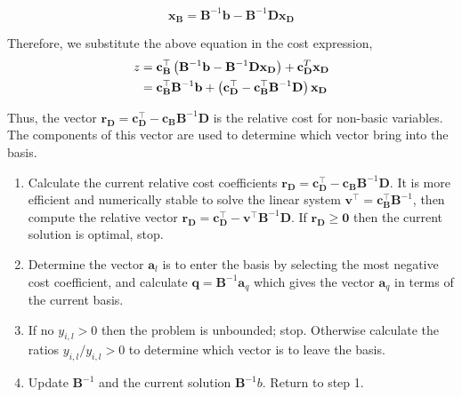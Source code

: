 \begin{equation*}
	\mathbf{x}_{\mathbf{B}}=\mathbf{B}^{-1}\mathbf{b}-\mathbf{B}^{-1}\mathbf{D}\mathbf{x}_{\mathbf{D}}
\end{equation*}

Therefore, we substitute the above equation in the cost expression,
\begin{align*}
	z&=\mathbf{c}_{\mathbf{B}}^\top\left( \mathbf{B}^{-1}\mathbf{b}-\mathbf{B}^{-1}\mathbf{Dx}_{\mathbf D} \right)+\mathbf{c}_{\mathbf{D}}^T \mathbf{x}_{\mathbf D}\\
	&=\mathbf{c}_{\mathbf{B}}^\top\mathbf{B}^{-1}\mathbf{b}+\left( \mathbf{c}_{\mathbf{D}}^\top-\mathbf{c}_{\mathbf{B}}^\top\mathbf{B}^{-1}\mathbf{D} \right)\mathbf{x}_{\mathbf{D}}
\end{align*}


Thus, the vector $\mathbf{r}_{\mathbf{D}}=\mathbf{c}_{\mathbf{D}}^\top-\mathbf{c}_{\mathbf{B}}\mathbf{B}^{-1}\mathbf{D}$ is the relative cost for non-basic variables. The components of this vector are used to determine which vector bring into the basis.

\begin{enumerate}
	\item Calculate the current relative cost coefficients $\mathbf{r}_{\mathbf{D}}=\mathbf{c}_{\mathbf{D}}^\top-\mathbf{c}_{\mathbf{B}}\mathbf{B}^{-1}\mathbf{D}$. It is more efficient and numerically stable to solve the linear system $\mathbf{v}^\top = \mathbf{c}_{\mathbf{B}}^\top\mathbf{B}^{-1}$, then compute the relative vector
	$ \mathbf{r}_{\mathbf{D}}=\mathbf{c}_{\mathbf{D}}^\top-\mathbf{v}^\top\mathbf{B}^{-1}\mathbf{D}$. If $\mathbf{r}_{\mathbf{D}}\geq \mathbf{0}$ then the current solution is optimal, stop.
	\item Determine the vector $\mathbf{a}_l$ is to enter the basis by selecting the most negative cost coefficient, and calculate $\mathbf{q}=\mathbf{B}^{-1}\mathbf{a}_q$ which gives the vector $\mathbf{a}_q$ in terms of the current basis.
	\item If no $y_{i,l}>0$ then the problem is unbounded; stop. Otherwise calculate the ratios $y_{i,l}/y_{i,l}>0$ to determine which vector is to leave the basis.
	\item Update $\mathbf{B}^{-1}$ and the current solution $\mathbf{B}^{-1}b$. Return to step 1.
\end{enumerate}

